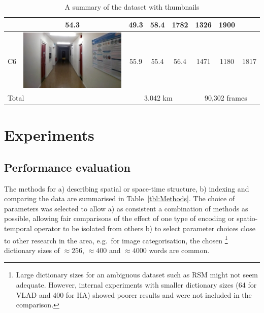 \begin{table}[ht]
\begin{center}
\begin{tabular}{l c c c c c c c}
\begin{minipage}{.2\textwidth}
			   \end{minipage}
			        & 54.3  & 49.3 & 58.4 & 1782          & 1326 & 1900 \\ \hline
    C6       & \begin{minipage}{.2\textwidth}
      			\includegraphics[width=\linewidth]{./gfx/Chapter04/table/6.jpg}
			   \end{minipage}
			        & 55.9  & 55.4 & 56.4 & 1471          & 1180 & 1817 \\ \hline \hline
	\multicolumn{2}{l}{Total}      & \multicolumn{3}{c}{3.042 km} & \multicolumn{3}{c}{90,302 frames} \\ \hline
    \end{tabular}
\end{center}
\caption{A summary of the dataset with thumbnails}
\label{tbl:Datasets}
\end{table}


\section{Experiments}
\label{sec:exp_methods}

\subsection{Performance evaluation}

The methods for a) describing spatial or space-time structure, b) indexing and comparing the data are summarised in Table~\ref{tbl:Methods}. The choice of parameters was selected to allow a) as consistent a combination of methods as possible, allowing fair comparisons of the effect of one type of encoding or spatio-temporal operator to be isolated from others b) to select parameter choices close to other research in the area, e.g.\ for image categorisation, the chosen \footnote{Large dictionary sizes for an ambiguous dataset such as RSM might not seem adequate. However, internal experiments with smaller dictionary sizes (64 for VLAD and 400 for HA) showed poorer results and were not included in the comparison.} dictionary sizes of $\approx 256$, $\approx 400$ and $\approx 4000$ words are common. 

